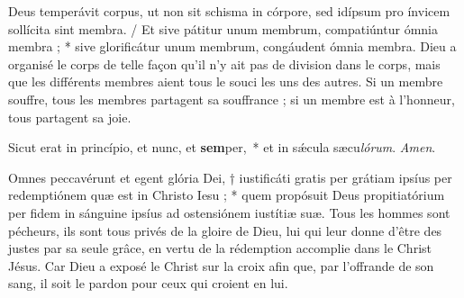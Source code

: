 \documentclass[Session2025.tex]{subfiles}
\begin{document}
{Deus temperávit corpus, ut non sit schisma in córpore, sed idípsum
pro ínvicem sollícita sint membra. / Et sive pátitur unum membrum,
compatiúntur ómnia membra ; * sive glorificátur unum membrum,
congáudent ómnia membra.}
{Dieu a organisé le corps de telle façon qu’il n’y ait pas de division dans
le corps, mais que les différents membres aient tous le souci les uns des
autres. Si un membre souffre, tous les membres partagent sa souffrance ;
si un membre est à l’honneur, tous partagent sa joie.}







\hspace{10pt}Sicut erat in princípio, et nunc, et \textbf{sem}per,~* et in sǽcula sæcu\textit{lórum}. \textit{Amen}.



\pagebreak

{Omnes peccavérunt et egent glória Dei, † iustificáti gratis per grátiam
ipsíus per redemptiónem quæ est in Christo Iesu ; * quem propósuit Deus
propitiatórium per fidem in sánguine ipsíus ad ostensiónem iustítiæ suæ.}
{Tous les hommes sont pécheurs, ils sont tous privés de la gloire de Dieu,
lui qui leur donne d’être des justes par sa seule grâce, en vertu de la
rédemption accomplie dans le Christ Jésus. Car Dieu a exposé le Christ
sur la croix afin que, par l’offrande de son sang, il soit le pardon pour
ceux qui croient en lui.}
\end{document}

